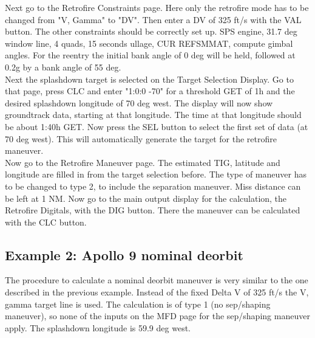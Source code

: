 \documentclass[11pt]{article} %
\begin{document}
Next go to the Retrofire Constraints page. Here only the retrofire mode has to be changed from "V, Gamma" to "DV". Then enter a DV of 325 ft/s with the VAL button. The other constraints should be correctly set up. SPS engine, 31.7 deg window line, 4 quads, 15 seconds ullage, CUR REFSMMAT, compute gimbal angles. For the reentry the initial bank angle of 0 deg will be held, followed at 0.2g by a bank angle of 55 deg.\\

Next the splashdown target is selected on the Target Selection Display. Go to that page, press CLC and enter "1:0:0 -70" for a threshold GET of 1h and the desired splashdown longitude of 70 deg west. The display will now show groundtrack data, starting at that longitude. The time at that longitude should be about 1:40h GET. Now press the SEL button to select the first set of data (at 70 deg west). This will automatically generate the target for the retrofire maneuver.\\

Now go to the Retrofire Maneuver page. The estimated TIG, latitude and longitude are filled in from the target selection before. The type of maneuver has to be changed to type 2, to include the separation maneuver. Miss distance can be left at 1 NM. Now go to the main output display for the calculation, the Retrofire Digitals, with the DIG button. There the maneuver can be calculated with the CLC button.\\

\subsection{Example 2: Apollo 9 nominal deorbit}

The procedure to calculate a nominal deorbit maneuver is very similar to the one described in the previous example. Instead of the fixed Delta V of 325 ft/s the V, gamma target line is used. The calculation is of type 1 (no sep/shaping maneuver), so none of the inputs on the MFD page for the sep/shaping maneuver apply. The splashdown longitude is 59.9 deg west.
\end{document}
